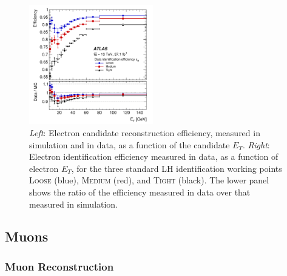 \begin{figure}[!htb]
    \begin{center}
        \includegraphics[width=0.48\textwidth]{figures/chapter3/egamma/egamma_id_eff_Et}
        \caption{
            {\color{red}{2015-2016}}
            \textit{Left}: Electron candidate reconstruction efficiency, measured in simulation and in data, as
                a function of the candidate $E_T$.
            \textit{Right}: Electron identification efficiency measured in data, as a function of electron $E_T$,
                for the three standard LH identification working points \textsc{Loose} (blue), \textsc{Medium} (red), and \textsc{Tight} (black).
                The lower panel shows the ratio of the efficiency measured in data over that measured in simulation.
        }
        \label{fig:egamma_eff_Et}
    \end{center}
\end{figure}

\subsection{Muons}
\label{sec:muons}

\subsubsection{Muon Reconstruction}
\label{sec:muon_reco}

